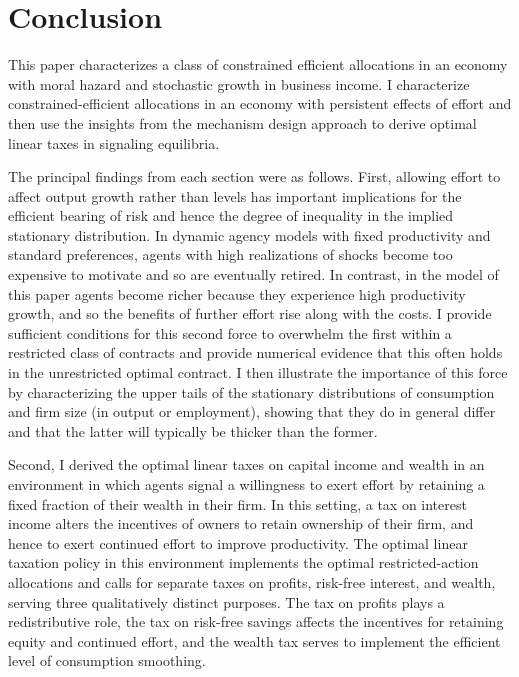 \documentclass[11pt]{article}
\theoremstyle{plain}
\begin{document}


\section{Conclusion} \label{Conc}


This paper characterizes a class of constrained efficient allocations in an economy with moral hazard and stochastic growth in business income. I characterize constrained-efficient allocations in an economy with persistent effects of effort and then use the insights from the mechanism design approach to derive optimal linear taxes in signaling equilibria. 

The principal findings from each section were as follows. First, allowing effort to affect output growth rather than levels has important implications for the efficient bearing of risk and hence the degree of inequality in the implied stationary distribution. In dynamic agency models with fixed productivity and standard preferences, agents with high realizations of shocks become too expensive to motivate and so are eventually retired. In contrast, in the model of this paper agents become richer because they experience high productivity growth, and so the benefits of further effort rise along with the costs. I provide sufficient conditions for this second force to overwhelm the first within a restricted class of contracts and provide numerical evidence that this often holds in the unrestricted optimal contract. I then illustrate the importance of this force by characterizing the upper tails of the stationary distributions of consumption and firm size (in output or employment), showing that they do in general differ and that the latter will typically be thicker than the former. 

Second, I derived the optimal linear taxes on capital income and wealth in an environment in which agents signal a willingness to exert effort by retaining a fixed fraction of their wealth in their firm. In this setting, a tax on interest income alters the incentives of owners to retain ownership of their firm, and hence to exert continued effort to improve productivity. The optimal linear taxation policy in this environment implements the optimal restricted-action allocations and calls for separate taxes on profits, risk-free interest, and wealth, serving three qualitatively distinct purposes. The tax on profits plays a redistributive role, the tax on risk-free savings affects the incentives for retaining equity and continued effort, and the wealth tax serves to implement the efficient level of consumption smoothing. 
\end{document}
